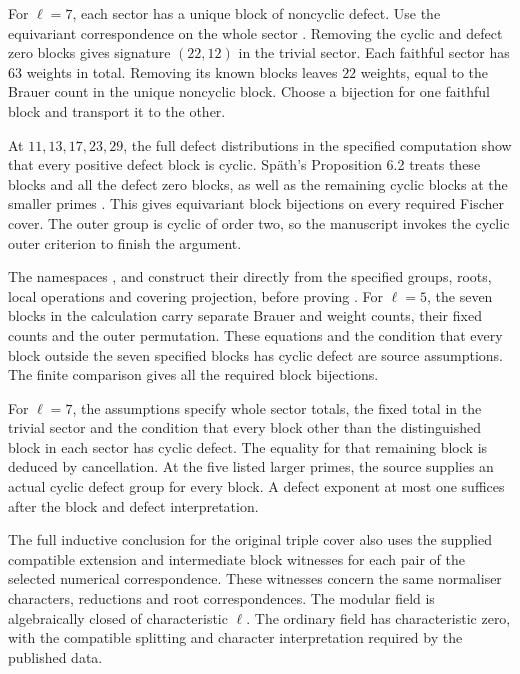For $\ell=7$, each sector has a unique block of noncyclic defect. Use the
equivariant correspondence on the whole sector
\cite[Section~4.3.4 and Table~8]{AnDietrich2012}. Removing the cyclic and defect zero blocks gives
signature $(22,12)$ in the trivial sector. Each faithful sector has $63$
weights in total. Removing its known blocks leaves $22$ weights, equal to
the Brauer count in the unique noncyclic block. Choose a bijection for one
faithful block and transport it to the other.

At $11,13,17,23,29$, the full defect distributions in the specified
computation show that every positive defect block is cyclic. Sp\"ath's
Proposition 6.2 treats these blocks and all the defect zero blocks, as well
as the remaining cyclic blocks at the smaller primes \cite{Spath2013}. This
gives equivariant block bijections on every required Fischer cover. The
outer group is cyclic of order two, so the manuscript invokes the cyclic
outer criterion to finish the argument.

\begin{implementation}
The namespaces ,
 and  construct their
 directly from the specified groups, roots,
local operations and covering projection, before proving
. For $\ell=5$, the seven blocks in the calculation
carry separate Brauer and weight counts, their fixed counts
and the outer permutation. These equations and the condition that every block outside the seven specified blocks has cyclic defect are source assumptions.
The finite comparison gives all the required block bijections.

For $\ell=7$, the assumptions specify whole sector totals, the fixed total in the trivial sector and the condition that every block other than the distinguished block in each sector has cyclic defect. The equality for that remaining block is deduced by cancellation. At
the five listed larger primes, the source supplies an actual cyclic defect
group for every block. A defect exponent at most one suffices after the
block and defect interpretation.

The full inductive conclusion for the original triple cover also uses the
supplied compatible extension and intermediate block witnesses for each
pair of the selected numerical correspondence. These witnesses concern
the same normaliser characters, reductions and root correspondences.
The modular field is algebraically closed of characteristic $\ell$.
The ordinary field has characteristic zero, with the compatible
splitting and character interpretation required by the published data.
\end{implementation}


